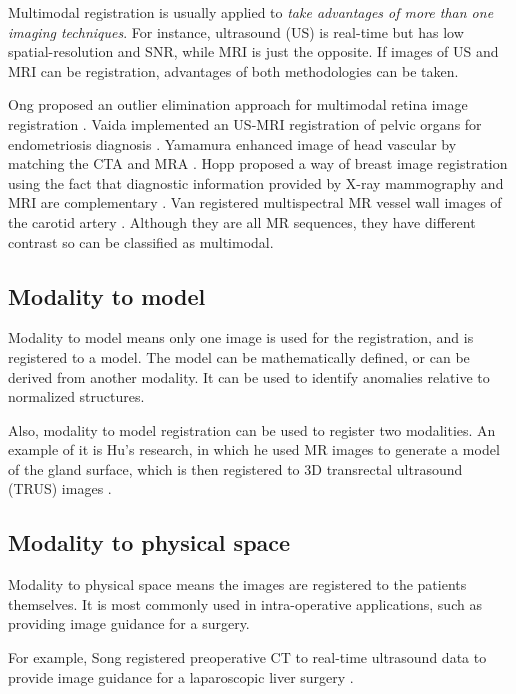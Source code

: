 \documentclass{IEEEtran}
\begin{document}
  Multimodal registration is usually applied to \emph{take advantages of more than one imaging techniques}. For instance, ultrasound (US) is real-time but has low spatial-resolution and SNR, while MRI is just the opposite. If images of US and MRI can be registration, advantages of both methodologies can be taken.

  Ong proposed an outlier elimination approach for multimodal retina image registration \cite{ong2015robust}. Vaida implemented an US-MRI registration of pelvic organs for endometriosis diagnosis \cite{vaida2012approach}. Yamamura enhanced image of head vascular by matching the CTA and MRA \cite{yamamura2014image}. Hopp proposed a way of breast image registration using the fact that diagnostic information provided by X-ray mammography and MRI are complementary \cite{hopp2013automatic}. Van registered multispectral MR vessel wall images of the carotid artery \cite{van2013automated}. Although they are all MR sequences, they have different contrast so can be classified as multimodal.

  \subsection{Modality to model}

  Modality to model means only one image is used for the registration, and is registered to a model. The model can be mathematically defined, or can be derived from another modality. It can be used to identify anomalies relative to normalized structures. \cite{maintz1998survey}

  Also, modality to model registration can be used to register two modalities. An example of it is Hu's research, in which he used MR images to generate a model of the gland surface, which is then registered to 3D transrectal ultrasound (TRUS) images \cite{hu2012mr}.

  \subsection{Modality to physical space}

  Modality to physical space means the images are registered to the patients themselves. It is most commonly used in intra-operative applications, such as providing image guidance for a surgery.

  For example, Song registered preoperative CT to real-time ultrasound data to provide image guidance for a laparoscopic liver surgery \cite{song2015locally}.
\end{document}
